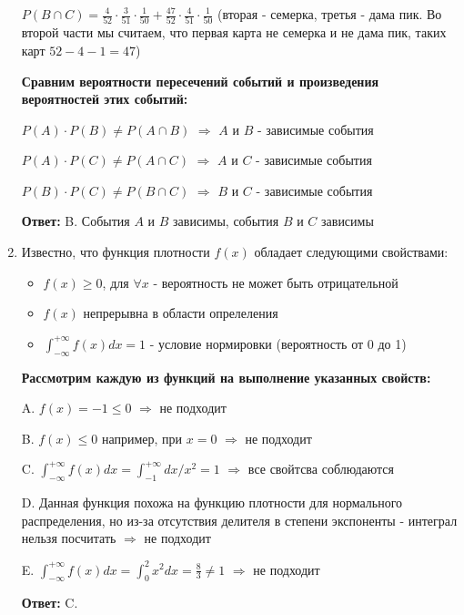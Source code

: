 \documentclass[a4paper]{article} %
\begin{document}
\begin{enumerate}
    $P(B \cap C) = \frac{4}{52}\cdot\frac{3}{51}\cdot\frac{1}{50} + \frac{47}{52}\cdot\frac{4}{51}\cdot\frac{1}{50}$ (вторая - семерка, третья - дама пик. Во второй части мы считаем, что первая карта не семерка и не дама пик, таких карт $52-4-1=47$)
    
    \textbf{Сравним вероятности пересечений событий и произведения вероятностей этих событий:}
    
    $ P(A) \cdot P(B) \neq P(A \cap B) $ $\Rightarrow$ $A$ и $B$ - зависимые события
    
    $ P(A) \cdot P(C) \neq P(A \cap C) $ $\Rightarrow$ $A$ и $C$ - зависимые события
    
    $ P(B) \cdot P(C) \neq P(B \cap C) $ $\Rightarrow$ $B$ и $C$ - зависимые события
    
    \textbf{Ответ:} B. События $A$ и $B$ зависимы, события $B$ и $C$ зависимы
    
    
    
    
    \item
    Известно, что функция плотности $f(x)$ обладает следующими свойствами:
    \begin{itemize}
        \item $f(x) \ge 0$, для $ \forall x$ - вероятность не может быть отрицательной
        \item $f(x)$ непрерывна в области опрелеления
        \item $ \int_{-\infty}^{+\infty} f(x) dx = 1$ - условие нормировки (вероятность от 0 до 1)
    \end{itemize}
    
    \textbf{Рассмотрим каждую из функций на выполнение указанных свойств:}
    
    A. $f(x) = -1 \le 0$ $\Rightarrow$ не подходит
    
    B. $f(x) \le 0$ например, при $x = 0$ $\Rightarrow$ не подходит
    
    C. $ \int_{-\infty}^{+\infty} f(x) dx = \int_{-1}^{+\infty} dx/x^2 = 1 $ $\Rightarrow$ все свойтсва соблюдаются
    
    D. Данная функция похожа на функцию плотности для нормального распределения, но из-за отсутствия делителя в степени экспоненты - интеграл нельзя посчитать $\Rightarrow$ не подходит
    
    E. $ \int_{-\infty}^{+\infty} f(x) dx = \int_{0}^{2} x^2 dx = \frac{8}{3} \neq 1 $ $\Rightarrow$ не подходит
    
    \textbf{Ответ:} C.
    
    
    

\end{enumerate}
\end{document}
